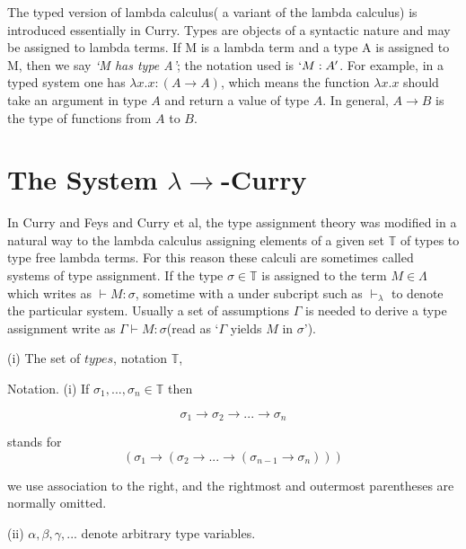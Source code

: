 The typed version of lambda calculus( a variant of the lambda calculus) is introduced essentially in Curry\cite{curry1934functionality}. Types are objects of a syntactic nature and may be assigned to lambda terms. If M is a lambda term and a type A is assigned to M, then we say \textit{`M has type A'}; the notation used is $`M:A'$. For example, in a typed system one has $\lambda x.x : (A \rightarrow A)$, which means the function $\lambda x.x$ should take an argument in type $A$ and return a value of type $A$. In general, $A \rightarrow B$ is the type of functions from $A$ to $B$.

\section{The System $\lambda \rightarrow $-Curry}

In Curry and Feys\cite{curry1972combinatory} and Curry et al\cite{curry1972combinatory2}, the type assignment theory was modified in a natural way to the lambda calculus assigning elements of a given set $\mathbb{T}$ of types to type free lambda terms. For this reason these calculi are sometimes called systems of type assignment. If the type $\sigma \in \mathbb{T}$ is assigned to the term $M \in \Lambda$ which writes as $\vdash M : \sigma$, sometime with a under subcript such as $\vdash _\lambda$ to denote the particular system. Usually a set of assumptions $\Gamma$ is needed to derive a type assignment write as $\Gamma \vdash M : \sigma$(read as `$\Gamma$ yields $M$ in $\sigma$').

\begin{def1}
\normalfont (i) The set of $types$, notation $\mathbb{T}$, 
\end{def1} 

Notation. (i) If $\sigma _1,...,\sigma _n \in \mathbb{T}$ then

\begin{equation*}
\sigma _1 \rightarrow \sigma _2 \rightarrow ... \rightarrow \sigma _n
\end{equation*}

stands for
\begin{equation*}
(\sigma _1 \rightarrow (\sigma _2 \rightarrow ... \rightarrow (\sigma _{n-1} \rightarrow \sigma _n)))
\end{equation*}

we use association to the right, and the rightmost and outermost parentheses are normally omitted. 

(ii) $\alpha,\beta,\gamma,...$ denote arbitrary type variables.



